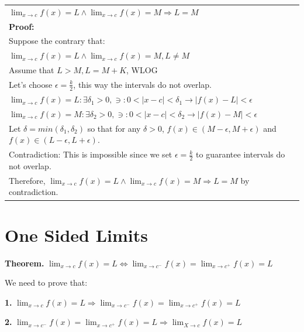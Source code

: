 \documentclass{article}
\begin{document}
\begin{center}
{\renewcommand{\arraystretch}{1.3}
\begin{tabular}{l}
$\displaystyle \lim_{x \to c} f(x) = L \land \lim_{x \to c} f(x) = M \Longrightarrow L = M$\\
\textbf{Proof:}\\
Suppose the contrary that:\\
$\displaystyle \lim_{x \to c} f(x) = L \land \lim_{x \to c} f(x) = M, L \neq M$\\
Assume that $L > M, L = M + K$, WLOG\\
Let's choose $\epsilon = \displaystyle\frac{k}{2}$, this way the intervals do not overlap.\\
$\displaystyle \lim_{x \to c} f(x) = L: \exists \delta_1 > 0, \ni: 0 < |x - c| < \delta_1 \rightarrow |f(x) - L| < \epsilon$\\
$\displaystyle \lim_{x \to c} f(x) = M: \exists \delta_2 > 0, \ni: 0 < |x - c| < \delta_2 \rightarrow |f(x) - M| < \epsilon$\\
Let $\delta = min(\delta_1, \delta_2)$ so that for any $\delta > 0$, $f(x) \in (M - \epsilon, M + \epsilon)$ and $f(x) \in (L - \epsilon, L + \epsilon)$.\\
Contradiction: This is impossible since we set $\epsilon = \displaystyle\frac{k}{2}$ to guarantee intervals do not overlap.\\
Therefore, $\displaystyle \lim_{x \to c} f(x) = L \land \lim_{x \to c} f(x) = M \Longrightarrow L = M$ by contradiction.
\end{tabular}}
\end{center}


\section{One Sided Limits}

\textbf{Theorem.} $\displaystyle \lim_{x \to c} f(x) = L \Longleftrightarrow \lim_{x \to c^-} f(x) = \lim_{x \to c^+} f(x) = L$

\vspace{0.3cm}

We need to prove that:

\textbf{1. } $\displaystyle \lim_{x \to c} f(x) = L \Rightarrow \lim_{x \to c^-} f(x) = \lim_{x \to c^+} f(x) = L$

\textbf{2. } $\displaystyle \lim_{x \to c^-} f(x) = \lim_{x \to c^+} f(x) = L \Rightarrow \lim_{X\to c} f(x) = L $
\end{document}
